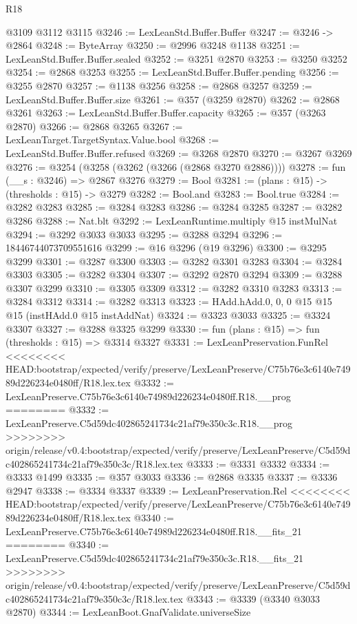 \begin{lexlean}{R18}
\begin{coremodule}
{{{{{{{{{{{{{{{{{{{{{{{{{{{{{{{{{{{{{{{{{{{{{{{{{{{{{{{{{{{{{{{{{{{{{{{{{{{{{{{{{{{{{{{{{{{{{{{{{{{{{{{{{{{{{{{{{{{{{{{{{{{{{{{{{{{{{{{{{{{{{{{    @3109
    @3112
    @3115
@3246 := LexLeanStd.Buffer.Buffer
@3247 := @3246 -> @2864
@3248 := ByteArray
@3250 := @2996 @3248 @1138
@3251 := LexLeanStd.Buffer.Buffer.sealed
@3252 := @3251 @2870
@3253 := @3250 @3252
@3254 := @2868 @3253
@3255 := LexLeanStd.Buffer.Buffer.pending
@3256 := @3255 @2870
@3257 := @1138 @3256
@3258 := @2868 @3257
@3259 := LexLeanStd.Buffer.Buffer.size
@3261 := @357 (@3259 @2870)
@3262 := @2868 @3261
@3263 := LexLeanStd.Buffer.Buffer.capacity
@3265 := @357 (@3263 @2870)
@3266 := @2868 @3265
@3267 := LexLeanTarget.TargetSyntax.Value.bool
@3268 := LexLeanStd.Buffer.Buffer.refused
@3269 := @3268 @2870
@3270 := @3267 @3269
@3276 := @3254 (@3258 (@3262 (@3266 (@2868 @3270 @2886))))
@3278 := fun (__s : @3246) => @2867 @3276
@3279 := Bool
@3281 := (plans : @15) -> (thresholds : @15) -> @3279
@3282 := Bool.and
@3283 := Bool.true
@3284 := @3282 @3283
@3285 := @3284 @3283
@3286 := @3284 @3285
@3287 := @3282 @3286
@3288 := Nat.blt
@3292 := LexLeanRuntime.multiply @15 instMulNat
@3294 := @3292 @3033 @3033
@3295 := @3288 @3294
@3296 := 18446744073709551616
@3299 := @16 @3296 (@19 @3296)
@3300 := @3295 @3299
@3301 := @3287 @3300
@3303 := @3282 @3301 @3283
@3304 := @3284 @3303
@3305 := @3282 @3304
@3307 := @3292 @2870 @3294
@3309 := @3288 @3307 @3299
@3310 := @3305 @3309
@3312 := @3282 @3310 @3283
@3313 := @3284 @3312
@3314 := @3282 @3313
@3323 := HAdd.hAdd.{0, 0, 0} @15 @15 @15 (instHAdd.{0} @15 instAddNat)
@3324 := @3323 @3033
@3325 := @3324 @3307
@3327 := @3288 @3325 @3299
@3330 := fun (plans : @15) => fun (thresholds : @15) => @3314 @3327
@3331 := LexLeanPreservation.FunRel
<<<<<<<< HEAD:bootstrap/expected/verify/preserve/LexLeanPreserve/C75b76e3c6140e74989d226234e0480ff/R18.lex.tex
@3332 := LexLeanPreserve.C75b76e3c6140e74989d226234e0480ff.R18.__prog
========
@3332 := LexLeanPreserve.C5d59dc402865241734c21af79e350c3c.R18.__prog
>>>>>>>> origin/release/v0.4:bootstrap/expected/verify/preserve/LexLeanPreserve/C5d59dc402865241734c21af79e350c3c/R18.lex.tex
@3333 := @3331 @3332
@3334 := @3333 @1499
@3335 := @357 @3033
@3336 := @2868 @3335
@3337 := @3336 @2947
@3338 := @3334 @3337
@3339 := LexLeanPreservation.Rel
<<<<<<<< HEAD:bootstrap/expected/verify/preserve/LexLeanPreserve/C75b76e3c6140e74989d226234e0480ff/R18.lex.tex
@3340 := LexLeanPreserve.C75b76e3c6140e74989d226234e0480ff.R18.__fits_21
========
@3340 := LexLeanPreserve.C5d59dc402865241734c21af79e350c3c.R18.__fits_21
>>>>>>>> origin/release/v0.4:bootstrap/expected/verify/preserve/LexLeanPreserve/C5d59dc402865241734c21af79e350c3c/R18.lex.tex
@3343 := @3339 (@3340 @3033 @2870)
@3344 := LexLeanBoot.GnafValidate.universeSize
}}}}}}}}}}}}}}}}}}}}}}}}}}}}}}}}}}}}}}}}}}}}}}}}}}}}}}}}}}}}}}}}}}}}}}}}}}}}}}}}}}}}}}}}}}}}}}}}}}}}}}}}}}}}}}}}}}}}}}}}}}}}}}}}}}}}}}}}}}}}}}}
\end{coremodule}
\end{lexlean}
